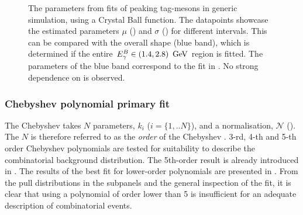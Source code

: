 \begin{figure}[htbp!]
    \centering
    \caption{\label{fig:crystal_ball_par_test}The parameters from \Mbc fits of peaking tag-\B mesons in generic \BB simulation, using a Crystal Ball function.
    The datapoints showcase the estimated parameters $\mu$ () and $\sigma$ () for different
    \EB intervals.
    This can be compared with the overall shape (blue band), which is determined if the entire ${E^B_{\gamma}}\in(1.4,2.8)~\mathrm{\,Ge\kern -0.1em V}$ region is fitted.
    The parameters of the blue band correspond to the fit in .
    No strong dependence on \EB is observed.
    }
\end{figure}

\subsubsection{Chebyshev polynomial primary fit}\label{sec:chebyshev_prefit}

The Chebyshev \PDF takes $N$ parameters, $k_i$ ($i=\{1,..N\}$), and a normalisation, $\mathcal{N}$ ().
The $N$ is therefore referred to as the \textit{order} of the Chebyshev \PDF.
3-rd, 4-th and 5-th order Chebyshev polynomials are tested for suitability to describe the combinatorial \BB background distribution.
The 5th-order result is already introduced in .
The results of the best fit for lower-order polynomials are presented in .
From the pull distributions in the subpanels and the general inspection of the fit, it is clear that using a polynomial of order lower than 5 is insufficient for an adequate description of combinatorial \BB events.

